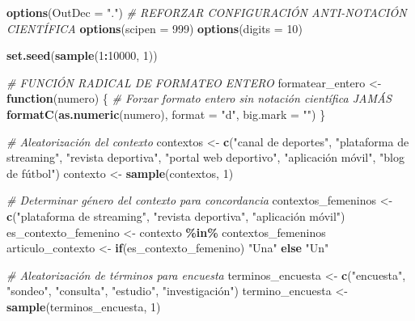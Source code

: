 \documentclass[
]{article}
\author{}
\date{\vspace{-2.5em}}
\newenvironment{Shaded}{\begin{snugshade}}{\end{snugshade}}
\newcommand{\AttributeTok}[1]{\textcolor[rgb]{0.13,0.29,0.53}{#1}}
\newcommand{\CommentTok}[1]{\textcolor[rgb]{0.56,0.35,0.01}{\textit{#1}}}
\newcommand{\ControlFlowTok}[1]{\textcolor[rgb]{0.13,0.29,0.53}{\textbf{#1}}}
\newcommand{\DecValTok}[1]{\textcolor[rgb]{0.00,0.00,0.81}{#1}}
\newcommand{\FunctionTok}[1]{\textcolor[rgb]{0.13,0.29,0.53}{\textbf{#1}}}
\newcommand{\NormalTok}[1]{#1}
\newcommand{\OtherTok}[1]{\textcolor[rgb]{0.56,0.35,0.01}{#1}}
\newcommand{\SpecialCharTok}[1]{\textcolor[rgb]{0.81,0.36,0.00}{\textbf{#1}}}
\newcommand{\StringTok}[1]{\textcolor[rgb]{0.31,0.60,0.02}{#1}}
\begin{document}
\begin{Shaded}
\begin{Highlighting}[]
\FunctionTok{options}\NormalTok{(}\AttributeTok{OutDec =} \StringTok{"."}\NormalTok{)}
\CommentTok{\# REFORZAR CONFIGURACIÓN ANTI{-}NOTACIÓN CIENTÍFICA}
\FunctionTok{options}\NormalTok{(}\AttributeTok{scipen =} \DecValTok{999}\NormalTok{)}
\FunctionTok{options}\NormalTok{(}\AttributeTok{digits =} \DecValTok{10}\NormalTok{)}

\FunctionTok{set.seed}\NormalTok{(}\FunctionTok{sample}\NormalTok{(}\DecValTok{1}\SpecialCharTok{:}\DecValTok{10000}\NormalTok{, }\DecValTok{1}\NormalTok{))}

\CommentTok{\# FUNCIÓN RADICAL DE FORMATEO ENTERO}
\NormalTok{formatear\_entero }\OtherTok{\textless{}{-}} \ControlFlowTok{function}\NormalTok{(numero) \{}
  \CommentTok{\# Forzar formato entero sin notación científica JAMÁS}
  \FunctionTok{formatC}\NormalTok{(}\FunctionTok{as.numeric}\NormalTok{(numero), }\AttributeTok{format =} \StringTok{"d"}\NormalTok{, }\AttributeTok{big.mark =} \StringTok{""}\NormalTok{)}
\NormalTok{\}}

\CommentTok{\# Aleatorización del contexto}
\NormalTok{contextos }\OtherTok{\textless{}{-}} \FunctionTok{c}\NormalTok{(}\StringTok{"canal de deportes"}\NormalTok{, }\StringTok{"plataforma de streaming"}\NormalTok{, }\StringTok{"revista deportiva"}\NormalTok{,}
               \StringTok{"portal web deportivo"}\NormalTok{, }\StringTok{"aplicación móvil"}\NormalTok{, }\StringTok{"blog de fútbol"}\NormalTok{)}
\NormalTok{contexto }\OtherTok{\textless{}{-}} \FunctionTok{sample}\NormalTok{(contextos, }\DecValTok{1}\NormalTok{)}

\CommentTok{\# Determinar género del contexto para concordancia}
\NormalTok{contextos\_femeninos }\OtherTok{\textless{}{-}} \FunctionTok{c}\NormalTok{(}\StringTok{"plataforma de streaming"}\NormalTok{, }\StringTok{"revista deportiva"}\NormalTok{, }\StringTok{"aplicación móvil"}\NormalTok{)}
\NormalTok{es\_contexto\_femenino }\OtherTok{\textless{}{-}}\NormalTok{ contexto }\SpecialCharTok{\%in\%}\NormalTok{ contextos\_femeninos}
\NormalTok{articulo\_contexto }\OtherTok{\textless{}{-}} \ControlFlowTok{if}\NormalTok{(es\_contexto\_femenino) }\StringTok{"Una"} \ControlFlowTok{else} \StringTok{"Un"}

\CommentTok{\# Aleatorización de términos para encuesta}
\NormalTok{terminos\_encuesta }\OtherTok{\textless{}{-}} \FunctionTok{c}\NormalTok{(}\StringTok{"encuesta"}\NormalTok{, }\StringTok{"sondeo"}\NormalTok{, }\StringTok{"consulta"}\NormalTok{, }\StringTok{"estudio"}\NormalTok{, }\StringTok{"investigación"}\NormalTok{)}
\NormalTok{termino\_encuesta }\OtherTok{\textless{}{-}} \FunctionTok{sample}\NormalTok{(terminos\_encuesta, }\DecValTok{1}\NormalTok{)}


\end{Highlighting}
\end{Shaded}
\end{document}
